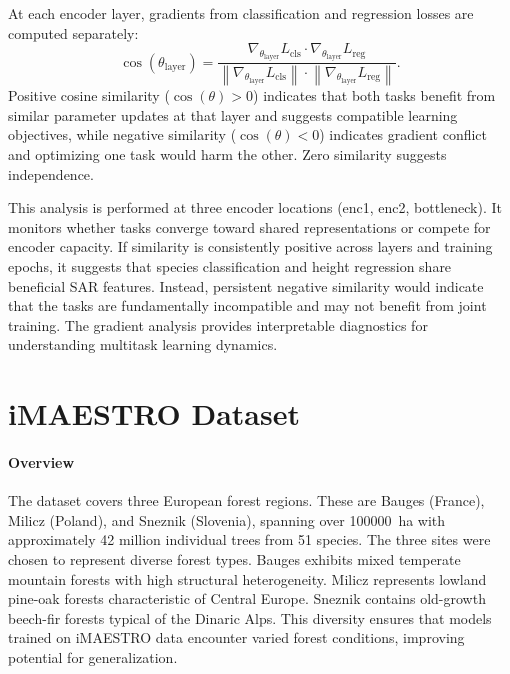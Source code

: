 At each encoder layer, gradients from classification and regression losses are computed separately:
\begin{equation}
    \cos(\theta_{\text{layer}}) = \frac{\nabla_{\theta_{\text{layer}}} L_{\text{cls}} \cdot \nabla_{\theta_{\text{layer}}} L_{\text{reg}}}{\left\lVert\nabla_{\theta_{\text{layer}}} L_{\text{cls}}\right\rVert \cdot \left\lVert\nabla_{\theta_{\text{layer}}} L_{\text{reg}}\right\rVert}.
\end{equation}
Positive cosine similarity ($\cos(\theta) > 0$) indicates that both tasks benefit from similar parameter updates at that layer and suggests compatible learning objectives, while negative similarity ($\cos(\theta) < 0$) indicates gradient conflict and optimizing one task would harm the other. Zero similarity suggests independence. 

This analysis is performed at three encoder locations (enc1, enc2, bottleneck). It monitors whether tasks converge toward shared representations or compete for encoder capacity. If similarity is consistently positive across layers and training epochs, it suggests that species classification and height regression share beneficial SAR features. Instead, persistent negative similarity would indicate that the tasks are fundamentally incompatible and may not benefit from joint training. The gradient analysis provides interpretable diagnostics for understanding multitask learning dynamics.

\section{iMAESTRO Dataset}
\label{sec:imaestro_dataset}


\paragraph{Overview}

The dataset covers three European forest regions. These are Bauges (France), Milicz (Poland), and Sneznik (Slovenia), spanning over \SI{100000}{\hectare} with approximately 42 million individual trees from 51 species. The three sites were chosen to represent diverse forest types. Bauges exhibits mixed temperate mountain forests with high structural heterogeneity. Milicz represents lowland pine-oak forests characteristic of Central Europe. Sneznik contains old-growth beech-fir forests typical of the Dinaric Alps. This diversity ensures that models trained on iMAESTRO data encounter varied forest conditions, improving potential for generalization.

